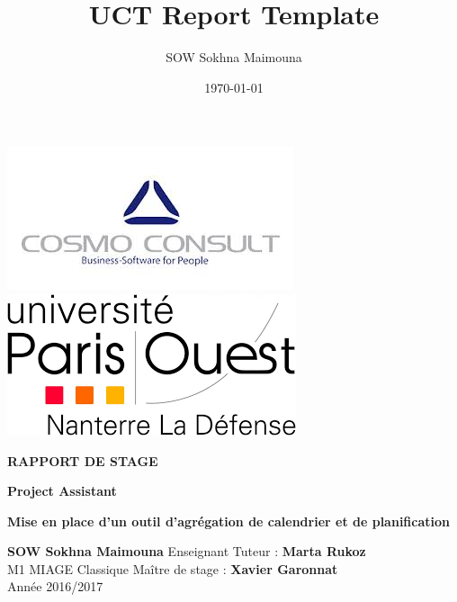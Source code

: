 \documentclass[12pt]{article}
\title{UCT Report Template}								%
\author{SOW Sokhna Maimouna}								%
\date{\today}											%
\begin{document}

\begin{titlepage}
\includegraphics[scale=0.5]{images/image1.jpg} 
\includegraphics[scale=0.3]{images/image2.png}

\hrulefill
\begin{center}\bfseries\Huge
     RAPPORT DE STAGE
\end{center}

\begin{center}\bfseries\Huge
	Project Assistant
\end{center}

\begin{center}\bfseries\Huge
Mise en place d'un outil d'agrégation de calendrier et de planification
\end{center}
\hrulefill

\vspace*{4cm}
\textbf{SOW Sokhna Maimouna}  
Enseignant Tuteur : \textbf{Marta Rukoz} \\
M1 MIAGE Classique 
Maître de stage : \textbf{Xavier Garonnat} \\
Année 2016/2017 \\ 
 
\end{titlepage}

\thispagestyle{empty}
\newpage
~
\end{document}
